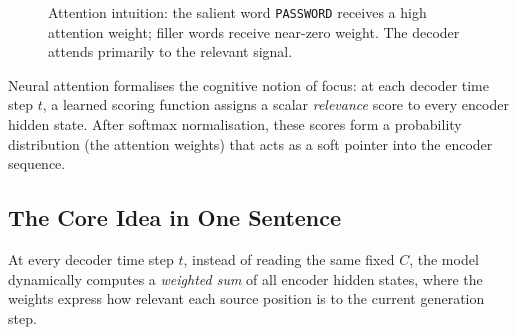 \documentclass[12pt,a4paper]{article}
\begin{document}
\begin{figure}[ht]
\centering
{}
\caption{Attention intuition: the salient word \texttt{PASSWORD}
         receives a high attention weight; filler words receive
         near-zero weight.  The decoder attends primarily to the
         relevant signal.}
\label{fig:attention-intuition}
\end{figure}

\begin{keyinsight}[title=Attention as Selective Focus]
  Neural attention formalises the cognitive notion of focus:
  at each decoder time step $t$, a learned scoring function assigns
  a scalar \emph{relevance} score to every encoder hidden state.
  After softmax normalisation, these scores form a probability
  distribution (the attention weights) that acts as a soft pointer
  into the encoder sequence.
\end{keyinsight}

\subsection{The Core Idea in One Sentence}

At every decoder time step $t$, instead of reading the same fixed
$C$, the model dynamically computes a \emph{weighted sum} of all
encoder hidden states, where the weights express how relevant each
source position is to the current generation step.

\end{document}
